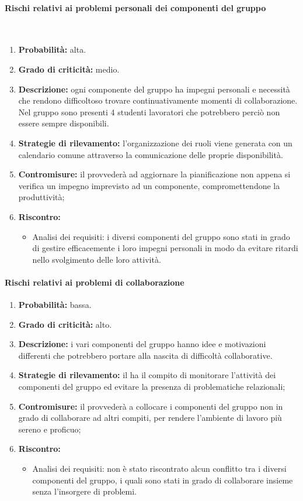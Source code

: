 \paragraph{Rischi relativi ai problemi personali dei componenti del gruppo}\mbox{}\\
\begin{enumerate}
	\item \textbf{Probabilità:} alta.
	\item \textbf{Grado di criticità:} medio.
	\item \textbf{Descrizione:} ogni componente del gruppo ha impegni personali e necessità che rendono difficoltoso trovare continuativamente momenti di collaborazione. Nel gruppo sono presenti 4 studenti lavoratori che potrebbero perciò non essere sempre disponibili.
	\item \textbf{Strategie di rilevamento:} l’organizzazione dei ruoli viene generata con un calendario comune attraverso la comunicazione delle proprie disponibilità.
	\item \textbf{Contromisure:} il \Responsabile{} provvederà ad aggiornare la pianificazione non appena si verifica un impegno imprevisto ad un componente, compromettendone la produttività;
	\item \textbf{Riscontro:}
	\begin{itemize}
		\item Analisi dei requisiti: i diversi componenti del gruppo sono stati in grado di gestire efficacemente i loro impegni personali in modo da evitare ritardi nello svolgimento delle loro attività.
	\end{itemize}
\end{enumerate}

\paragraph{Rischi relativi ai problemi di collaborazione}\mbox{}
\begin{enumerate}
	\item \textbf{Probabilità:} bassa.
	\item \textbf{Grado di criticità:} alto.
	\item \textbf{Descrizione:} i vari componenti del gruppo hanno idee e motivazioni differenti che potrebbero portare alla nascita di difficoltà collaborative.
	\item \textbf{Strategie di rilevamento:} il \Responsabile{} ha il compito di monitorare l’attività dei componenti del gruppo ed evitare la presenza di problematiche relazionali;
	\item \textbf{Contromisure:} il \Responsabile{} provvederà a collocare i componenti del gruppo non in grado di collaborare ad altri compiti, per rendere l’ambiente di lavoro più sereno e proficuo;
	\item \textbf{Riscontro:}
	\begin{itemize}
		\item Analisi dei requisiti: non è stato riscontrato alcun conflitto tra i diversi componenti del gruppo, i quali sono stati in grado di collaborare insieme senza l'insorgere di problemi.
	\end{itemize}
\end{enumerate}

